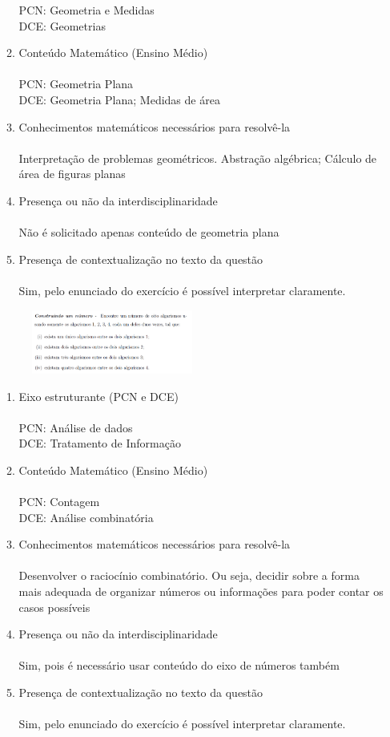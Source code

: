 \documentclass[a4paper, 12pt]{article}
\begin{document}
\begin{enumerate}
\begin{enumerate}
    PCN: Geometria e Medidas\\
    DCE: Geometrias
  \item Conteúdo Matemático (Ensino Médio) \\\\
    PCN: Geometria Plana \\
    DCE: Geometria Plana; Medidas de área
  \item Conhecimentos matemáticos necessários para resolvê-la \\\\
    Interpretação de problemas geométricos. Abstração algébrica; Cálculo de área de figuras planas    
  \item Presença ou não da interdisciplinaridade \\\\
    Não é solicitado apenas conteúdo de geometria plana
  \item Presença de contextualização no texto da questão\\\\
    Sim, pelo enunciado do exercício é possível interpretar claramente.
  \end{enumerate}
\begin{figure}[h!]
  \centering
  \includegraphics[width=0.5\textwidth]{4}
\end{figure} 
  \begin{enumerate}
  \item Eixo estruturante (PCN e DCE)\\\\
    PCN: Análise de dados \\
    DCE: Tratamento de Informação
  \item Conteúdo Matemático (Ensino Médio) \\\\
    PCN: Contagem\\
    DCE: Análise combinatória   
  \item Conhecimentos matemáticos necessários para resolvê-la \\\\
    Desenvolver o raciocínio combinatório. Ou seja, decidir sobre a forma mais adequada de organizar números ou informações para poder contar os casos possíveis
  \item Presença ou não da interdisciplinaridade \\\\
    Sim, pois é necessário usar conteúdo do eixo de números também
  \item Presença de contextualização no texto da questão\\\\
    Sim, pelo enunciado do exercício é possível interpretar claramente.
  \end{enumerate}
\end{enumerate}
\end{document}
